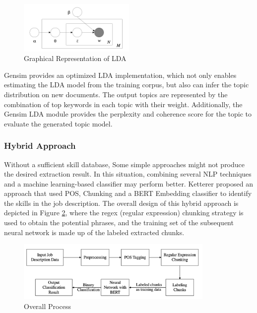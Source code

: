  \begin{figure}[H]
    \centering
    \includegraphics[width=0.5\textwidth]{images/LDA.png}
    \caption{Graphical Representation of LDA \cite{blei2003latent}}
    \label{fig:10}
\end{figure}

Gensim provides an optimized LDA implementation, which not only enables estimating the LDA model from the training corpus, but also can infer the topic distribution on new documents. The output topics are represented by the combination of top keywords in each topic with their weight. Additionally, the Gensim LDA module provides the perplexity and coherence score for the topic to evaluate the generated topic model. 

\subsubsection{Hybrid Approach}
\label{sec:hybrid}

Without a sufficient skill database, Some simple approaches might not produce the desired extraction result. In this situation, combining several NLP techniques and a machine learning-based classifier may perform better. Ketterer \cite{ketterer} proposed an approach that used POS, Chunking and a BERT Embedding classifier to identify the skills in the job description. The overall design of this hybrid approach is depicted in Figure \ref{fig:13}, where the regex (regular expression) chunking strategy is used to obtain the potential phrases, and the training set of the subsequent neural network is made up of the labeled extracted chunks.

 \begin{figure}[H]
    \centering
    \includegraphics[width=0.85\textwidth]{images/Process.png}
    \caption{Overall Process}
    \label{fig:13}
\end{figure}


